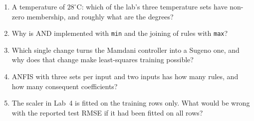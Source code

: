 \begin{quickcheck}
\begin{enumerate}
  \item A temperature of $28^\circ$C: which of the lab's three temperature sets have non-zero membership, and roughly what are the degrees?
  \item Why is AND implemented with \texttt{min} and the joining of rules with \texttt{max}?
  \item Which single change turns the Mamdani controller into a Sugeno one, and why does that change make least-squares training possible?
  \item ANFIS with three sets per input and two inputs has how many rules, and how many consequent coefficients?
  \item The scaler in Lab~4 is fitted on the training rows only. What would be wrong with the reported test RMSE if it had been fitted on all rows?
\end{enumerate}
\end{quickcheck}
